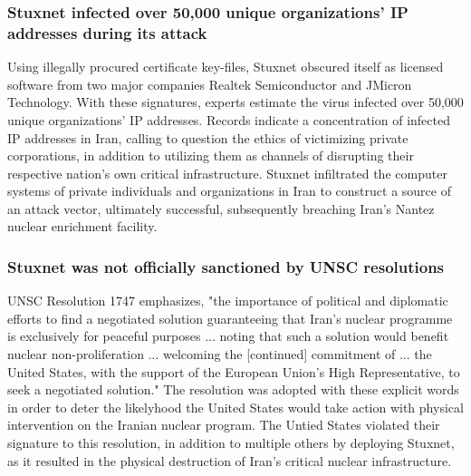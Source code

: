 \documentclass[12pt]{article}
\begin{document}
\begin{multicols}{2}


\subsubsection{Stuxnet infected over 50,000 unique organizations' IP addresses during its attack}

Using illegally procured certificate key-files, Stuxnet obscured itself as licensed software from two major companies Realtek Semiconductor and JMicron Technology. With these signatures, experts estimate the virus infected over 50,000 unique organizations' IP addresses.\cite{lessonsFromStuxnet} Records indicate a concentration of infected IP addresses in Iran, calling to question the ethics of victimizing private corporations, in addition to  utilizing them as channels of disrupting their respective nation's own critical infrastructure. Stuxnet infiltrated the computer systems of private individuals and organizations in Iran to construct a source of an attack vector, ultimately successful, subsequently breaching Iran's Nantez nuclear enrichment facility.\cite{w32.stuxnetDossier} 

\subsubsection{Stuxnet was not officially sanctioned by UNSC resolutions}

UNSC Resolution 1747 emphasizes, "the importance of political and diplomatic efforts to find a negotiated solution guaranteeing that Iran’s nuclear programme is exclusively for peaceful purposes ... noting that such a solution would benefit nuclear non-proliferation ... welcoming the [continued] commitment of ... the United States, with the support of the European Union’s High Representative, to seek a negotiated solution."\cite{resolution1747} The resolution was adopted with these explicit words in order to deter the likelyhood the United States would take action with physical intervention on the Iranian nuclear program. The Untied States violated their signature to this resolution, in addition to multiple others by deploying Stuxnet, as it resulted in the physical destruction of Iran's critical nuclear infrastructure.


\end{multicols}
\end{document}
